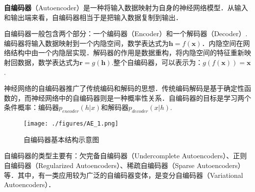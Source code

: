 
\textbf{自编码器}（Autoencoder）是一种将输入数据映射为自身的神经网络模型．从输入和输出端来看，自编码器相当于是把输入数据复制到输出．

自编码器一般包含两个部分：一个编码器（Encoder）和一个解码器（Decoder）.编码器将输入数据映射到一个内隐空间，数学表达式为$\boldsymbol{h}=f(\boldsymbol{x})$．内隐空间在网络结构中由一个内隐层实现．解码器的作用是数据重构，将内隐空间的特征重新映射回数据，数学表达式为$\boldsymbol{r}=g(\boldsymbol{h})$.整个自编码器，可以表示为：$g(f(\boldsymbol{x}))=\boldsymbol{x}$.

神经网络的自编码器推广了传统编码和解码的思想．传统编码解码是基于确定性函数的，而神经网络中的自编码器则是一种概率性关系．自编码器的目标是学习两个条件概率：编码器$p_{encoder}(h|x)$和解码器$p_{decoder}(x|h)$\cite{GDL}.

\begin{figure}[ht]
\centering
\texttt{[image: ./figures/AE\_1.png]}
\caption{自编码器基本结构示意图} \label{AE_fig1}
\end{figure}


自编码器的类型主要有：欠完备自编码器（Undercomplete Autoencoders）、正则自编码器（Regularized Autoencoders）、稀疏自编码器（Sparse Autoencoders）等．其中，有一类应用较为广泛的自编码器变体，是变分自编码器（Variational Autoencoders）．